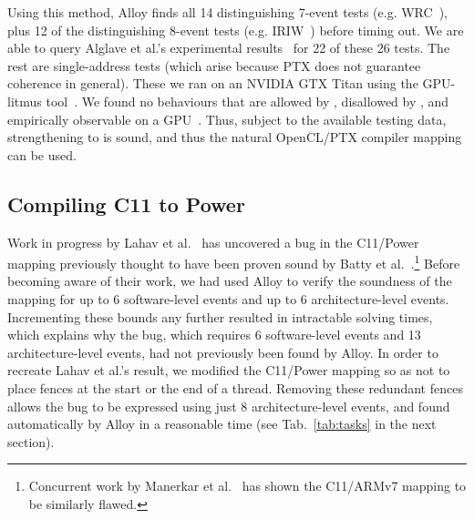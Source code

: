 Using this method, Alloy finds all 14 distinguishing 7-event tests
(e.g. WRC~\cite{mador-haim+12}), plus 12 of the distinguishing 8-event
tests (e.g. IRIW~\cite{boehm+08}) before timing out. We are able to
query Alglave et al.'s experimental results~\cite{alglave+15} for 22
of these 26 tests. The rest are single-address tests (which arise
because PTX does not guarantee coherence in general). These we ran on
an NVIDIA GTX Titan using the GPU-litmus tool~\cite{alglave+15}. We
found no behaviours that are allowed by , disallowed by
, and empirically observable on a
GPU~\cite{popl17supplementary}. Thus, subject to the available testing
data, strengthening  to  is sound, and thus the
natural OpenCL/PTX compiler mapping can be used.

\subsection{Compiling C11 to Power}
\label{sec:Q4_c11_power}

Work in progress by Lahav et al.~\cite{lahav+16b} has uncovered a bug
in the C11/Power mapping previously thought to have been proven sound
by Batty et al.~\cite{batty+12}.\footnote{Concurrent work by
Manerkar et al.~\cite{manerkar+16} has shown the C11/ARMv7
mapping to be similarly flawed.} Before becoming aware of their work, we
had used Alloy to verify the soundness of the mapping for up to 6
software-level events and up to 6 architecture-level
events. Incrementing these bounds any further resulted in intractable
solving times, which explains why the bug, which requires 6
software-level events and 13 architecture-level events, had not
previously been found by Alloy. In order to recreate Lahav et al.'s
result, we modified the C11/Power mapping so as not to place fences at
the start or the end of a thread. Removing these redundant fences allows
the bug to be expressed using just 8 architecture-level events, and
found automatically by Alloy in a reasonable time (see
Tab.~\ref{tab:tasks} in the next section).

